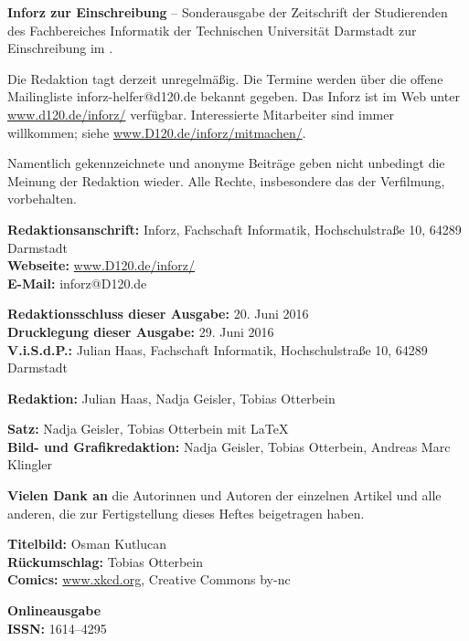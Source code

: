 \small

\textbf{Inforz zur Einschreibung \semester} – Sonderausgabe der Zeitschrift der Studierenden des Fachbereiches Informatik der Technischen Universität Darmstadt zur Einschreibung im \semester.

\vspace{4mm}
Die Redaktion tagt derzeit unregelmäßig. Die Termine werden über die offene Mailingliste inforz-helfer@d120.de bekannt gegeben. Das Inforz ist  im Web unter \url{www.d120.de/inforz/} verfügbar. Interessierte Mitarbeiter sind immer willkommen; siehe  \url{www.D120.de/inforz/mitmachen/}.

\vspace{4mm}
Namentlich gekennzeichnete und anonyme Beiträge geben nicht unbedingt die Meinung der Redaktion wieder. Alle Rechte, insbesondere das der Verfilmung, vorbehalten.


\textbf{Redaktionsanschrift:} Inforz, Fachschaft Informatik, Hochschulstraße 10, 64289 Darmstadt\\
\textbf{Webseite:} \url{www.D120.de/inforz/}\\
\textbf{E-Mail:} inforz@D120.de

\vspace{4mm}
\textbf{Redaktionsschluss dieser Ausgabe:} 20. Juni 2016\\
\textbf{Drucklegung dieser Ausgabe:} 29. Juni 2016\\
\textbf{V.i.S.d.P.:} Julian Haas, Fachschaft Informatik, Hochschulstraße 10, 64289 Darmstadt

\vspace{4mm}
\textbf{Redaktion:} Julian Haas, Nadja Geisler, Tobias Otterbein

\vspace{4mm}
\textbf{Satz:} Nadja Geisler, Tobias Otterbein mit \LaTeX\\
\textbf{Bild- und Grafikredaktion:} Nadja Geisler, Tobias Otterbein,  Andreas Marc Klingler

\vspace{4mm}
\textbf{Vielen Dank an} die Autorinnen und Autoren der einzelnen Artikel und alle anderen, die zur Fertigstellung dieses Heftes beigetragen haben.

\vspace{4mm}
\textbf{Titelbild:} Osman Kutlucan\\
\textbf{Rückumschlag:} Tobias Otterbein\\
\textbf{Comics:} \url{www.xkcd.org}, Creative Commons by-nc

\vspace{4mm}
\textbf{Onlineausgabe}\\
\textbf{ISSN:} 1614–4295

\newpage